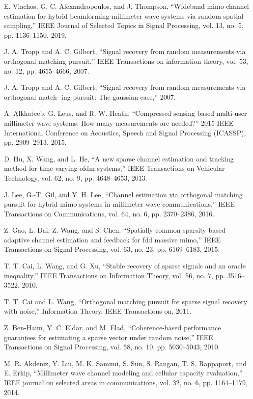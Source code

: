 \documentclass[journal]{IEEEtran}
\begin{document}
\begin{thebibliography}{30}
E. Vlachos, G. C. Alexandropoulos, and J. Thompson, “Wideband mimo channel estimation for hybrid beamforming millimeter wave systems via random spatial sampling,” IEEE Journal of Selected Topics in Signal Processing, vol. 13, no. 5, pp. 1136–1150, 2019.

J. A. Tropp and A. C. Gilbert, “Signal recovery from random measurements via orthogonal matching pursuit,” IEEE Transactions on information theory, vol. 53, no. 12, pp. 4655–4666, 2007.

J. A. Tropp and A. C. Gilbert, “Signal recovery from random measurements via orthogonal match-
ing pursuit: The gaussian case,” 2007.

A. Alkhateeb, G. Leus, and R. W. Heath, “Compressed sensing based multi-user millimeter wave systems: How many measurements are needed?” 2015 IEEE International Conference on Acoustics, Speech and Signal Processing (ICASSP), pp. 2909–2913, 2015.

D. Hu, X. Wang, and L. He, “A new sparse channel estimation and tracking method for time-varying ofdm systems,” IEEE Transactions on Vehicular Technology, vol. 62, no. 9, pp. 4648–4653, 2013.

J. Lee, G.-T. Gil, and Y. H. Lee, “Channel estimation via orthogonal matching pursuit for hybrid mimo systems in millimeter wave communications,” IEEE Transactions on Communications, vol. 64, no. 6, pp. 2370–2386, 2016.

Z. Gao, L. Dai, Z. Wang, and S. Chen, “Spatially common sparsity based adaptive channel estimation and feedback for fdd massive mimo,” IEEE Transactions on Signal Processing, vol. 63, no. 23, pp. 6169–6183, 2015.

T. T. Cai, L. Wang, and G. Xu, “Stable recovery of sparse signals and an oracle inequality,” IEEE Transactions on Information Theory, vol. 56, no. 7, pp. 3516–3522, 2010.

T. T. Cai and L. Wang, “Orthogonal matching pursuit for sparse signal recovery with noise,” Information Theory, IEEE Transactions on, 2011.

Z. Ben-Haim, Y. C. Eldar, and M. Elad, “Coherence-based performance guarantees for estimating a sparse vector under random noise,” IEEE Transactions on Signal Processing, vol. 58, no. 10, pp. 5030–5043, 2010.

M. R. Akdeniz, Y. Liu, M. K. Samimi, S. Sun, S. Rangan, T. S. Rappaport, and E. Erkip, “Millimeter wave channel modeling and cellular capacity evaluation,” IEEE journal on selected areas in communications, vol. 32, no. 6, pp. 1164–1179, 2014.


\end{thebibliography}
\end{document}
